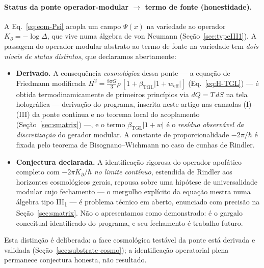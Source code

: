 \documentclass[12pt,a4paper]{article}
\newcommand{\betatgl}{\beta_{\text{TGL}}}
\newcommand{\Kpartial}{K_{\partial}}
\begin{document}
\paragraph{Status da ponte operador-modular $\to$ termo de fonte (honestidade).}
A Eq.~\eqref{eq:eom-Psi} acopla um campo $\Psi(x)$ na variedade ao operador
$\Kpartial = -\log\Delta$, que vive numa álgebra de von Neumann (Seção~\ref{sec:typeIII1}).
A passagem do operador modular abstrato ao termo de fonte na variedade tem
\emph{dois níveis de status distintos}, que declaramos abertamente:
\begin{itemize}[leftmargin=*]
\item \textbf{Derivado.} A consequência \emph{cosmológica} dessa ponte --- a
equação de Friedmann modificada
$H^2 = \tfrac{8\pi G}{3}\rho\,[1 + \betatgl|1+w_{\text{eff}}|]$
(Eq.~\ref{eq:H-TGL}) --- é obtida termodinamicamente de primeiros
princípios via $dQ = T\,dS$ na tela holográfica --- derivação do programa,
inscrita neste artigo nas camadas (I)--(III) da ponte contínua e no teorema
local do acoplamento (Seção~\ref{sec:smatrix}) ---, e o
termo $\betatgl|1+w|$ é o \emph{resíduo observável da discretização} do gerador
modular.  A constante de proporcionalidade $-2\pi/\hbar$ é fixada pelo teorema de
Bisognano--Wichmann no caso de cunhas de Rindler.
\item \textbf{Conjectura declarada.} A identificação rigorosa do operador
apofático completo com $-2\pi\Kpartial/\hbar$ \emph{no limite contínuo}, estendida
de Rindler aos horizontes cosmológicos gerais, repousa sobre uma hipótese de
universalidade modular cujo fechamento --- o mergulho explícito da equação
mestra numa álgebra tipo III\textsubscript{1} --- é problema técnico em
aberto, enunciado com precisão na Seção~\ref{sec:smatrix}.  Não o
apresentamos como demonstrado: é o gargalo
conceitual identificado do programa, e seu fechamento é trabalho futuro.
\end{itemize}
Esta distinção é deliberada: a face cosmológica testável da ponte está derivada
e validada (Seção~\ref{sec:substrate-cosmo}); a identificação operatorial plena
permanece conjectura honesta, não resultado.
\end{document}
